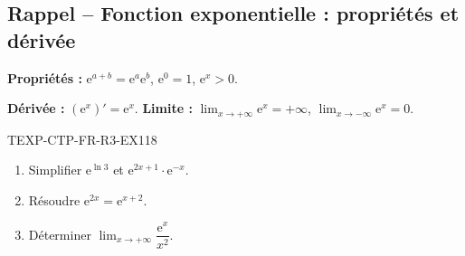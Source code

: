 

\subsection*{Rappel -- Fonction exponentielle : propriétés et dérivée}

\textbf{Propriétés :} $\mathrm{e}^{a+b} = \mathrm{e}^a \mathrm{e}^b$, $\mathrm{e}^0 = 1$, $\mathrm{e}^x > 0$.

\textbf{Dérivée :} $(\mathrm{e}^x)' = \mathrm{e}^x$. \textbf{Limite :} $\lim_{x \to +\infty} \mathrm{e}^x = +\infty$, $\lim_{x \to -\infty} \mathrm{e}^x = 0$.

\begin{exercice}{TEXP-CTP-FR-R3-EX1}{1}{8}
\begin{enumerate}
  \item Simplifier $\mathrm{e}^{\ln 3}$ et $\mathrm{e}^{2x + 1} \cdot \mathrm{e}^{-x}$.
  \item Résoudre $\mathrm{e}^{2x} = \mathrm{e}^{x+2}$.
  \item Déterminer $\lim_{x \to +\infty} \dfrac{\mathrm{e}^x}{x^2}$.
\end{enumerate}
\end{exercice}

